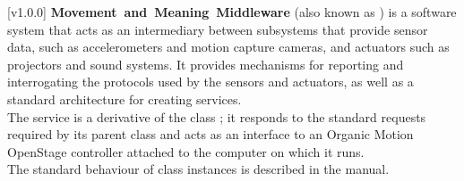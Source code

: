 [v1.0.0]
\textbf{Movement~and~Meaning~Middleware} (also known as \mplusm) is a software system
that acts as an intermediary between subsystems that provide sensor data, such as
accelerometers and motion capture cameras, and actuators such as projectors and sound
systems.
It provides mechanisms for reporting and interrogating the protocols used by the sensors
and actuators, as well as a standard architecture for creating services.\\

The \OSI{} service is a derivative of the \mplusm{} class ;
it responds to the standard requests required by its parent class and acts as an interface
to an Organic Motion OpenStage controller attached to the computer on which it runs.\\

The standard behaviour of  class instances is described in
the \emph{\MMM} manual.
\primaryEnd{}
